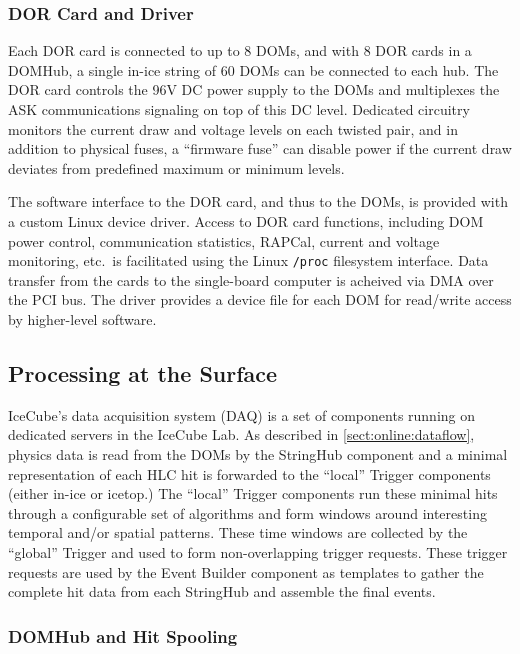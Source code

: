 
\subsubsection{DOR Card and Driver}

Each DOR card is connected to up to 8 DOMs, and with 8 DOR cards in a
DOMHub, a single in-ice string of 60 DOMs can be connected to each hub. The
DOR card controls the 96V DC power supply to the DOMs and multiplexes the
ASK communications signaling on top of this DC level.  Dedicated circuitry
monitors the current draw and voltage levels on each twisted pair, and in
addition to physical fuses, a ``firmware fuse'' can disable power if the
current draw deviates from predefined maximum or minimum levels.

The software interface to the DOR card, and thus to the DOMs, is provided
with a custom Linux device driver.  Access to DOR card functions,
including DOM power control, communication statistics, RAPCal, current and
voltage monitoring, etc.~is facilitated using the Linux \texttt{/proc}
filesystem interface.  Data transfer from the cards to the single-board
computer is acheived via DMA over the PCI bus.  The driver provides a
device file for each DOM for read/write access by higher-level software.

\subsection{Processing at the Surface}

IceCube's data acquisition system (DAQ) is a set of components running on
dedicated servers in the IceCube Lab.  As described in \ref{sect:online:dataflow}, physics data is read from the DOMs by the StringHub
component and a minimal representation of each HLC hit is forwarded to the
``local'' Trigger components (either in-ice or icetop.)
The ``local'' Trigger components run these
minimal hits through a configurable set of algorithms and form windows around
interesting temporal and/or spatial patterns.  These time windows are collected
by the ``global'' Trigger and used to form non-overlapping trigger requests.
These trigger requests are used by the Event Builder component as templates to
gather the complete hit data from each StringHub and assemble the final events.

\subsubsection{DOMHub and Hit Spooling}

